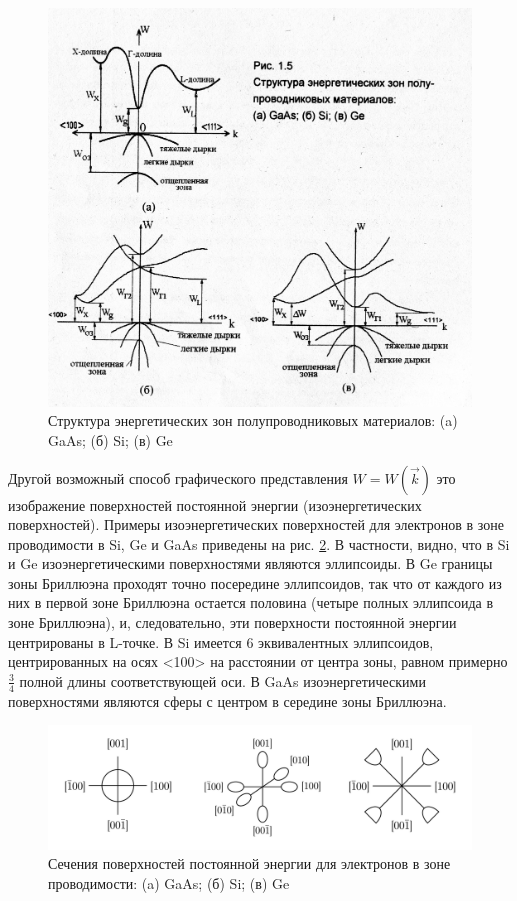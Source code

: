 \begin{figure}[h!]
	\centering
	\includegraphics[width = .9\linewidth]{img/15.jpg}
	\caption{Структура энергетических зон полупроводниковых материалов: (a) GaAs; (б) Si; (в) Ge}
	\label{fig:1.5}
\end{figure}

Другой возможный способ графического представления $W=W(\vec{k})$ это изображение поверхностей постоянной энергии
(изоэнергетических поверхностей). Примеры изоэнергетических поверхностей для электронов в зоне проводимости в Si, Ge и
GaAs приведены на рис. \ref{fig:1.6}. В частности, видно, что в Si и Ge изоэнергетическими поверхностями являются эллипсоиды. В Ge
границы зоны Бриллюэна проходят точно посередине эллипсоидов, так что от каждого из них в первой зоне Бриллюэна остается
половина (четыре полных эллипсоида в зоне Бриллюэна), и, следовательно, эти поверхности постоянной энергии центрированы
в L-точке. В Si имеется 6 эквивалентных эллипсоидов, центрированных на осях <100> на расстоянии от центра зоны, равном
примерно $\frac{3}{4}$ полной длины соответствующей оси. В GaAs изоэнергетическими поверхностями являются сферы с центром в середине
зоны Бриллюэна.

\begin{figure}[h!]
	\centering
	\includegraphics[width = .95\linewidth]{img/16}
	\caption{Сечения поверхностей постоянной энергии для электронов в зоне проводимости: (a) GaAs; (б) Si; (в) Ge}
	\label{fig:1.6}
\end{figure}

